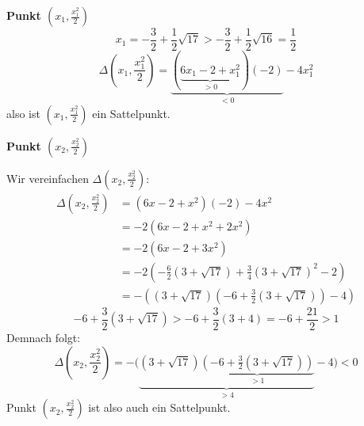 \documentclass[a4paper,12pt]{article}
\begin{document}
\begin{enumerate}[label=\alph*)]
    \textbf{Punkt $\left(x_1, \frac{x_1^2}{2}\right)$}
    \[
        x_1 = -\frac{3}{2} + \frac{1}{2}\sqrt{17} > -\frac{3}{2} + \frac{1}{2}\sqrt{16} = \frac{1}{2}
    \]
    \[
        \Delta\left(x_1, \frac{x_1^2}{2}\right) = \underbrace{(\underbrace{6x_1 - 2 + x_1^2}_{>0})(-2)}_{<0} - 4x_1^2
    \]
    also ist $\left(x_1, \frac{x_1^2}{2}\right)$ ein Sattelpunkt.

    \textbf{Punkt $\left(x_2, \frac{x_2^2}{2}\right)$}

    Wir vereinfachen $\Delta\left(x_2, \frac{x_2^2}{2}\right)$:
    \begin{align*}
        \Delta\left(x_2, \frac{x_2^2}{2}\right) &= (6x - 2 + x^2)(-2) - 4x^2 \\
        &= -2(6x - 2 + x^2 + 2x^2) \\
        &= -2(6x - 2 + 3x^2) \\
        &= -2\left(-\frac{6}{2}(3+\sqrt{17}) + \frac{3}{4}(3+\sqrt{17})^2 - 2\right) \\
        &= -\left((3+\sqrt{17})\left(-6 + \frac{3}{2}(3+\sqrt{17})\right) - 4\right)
    \end{align*}
    \[
        -6 + \frac{3}{2}(3+\sqrt{17}) > -6 + \frac{3}{2}(3+4) = -6 + \frac{21}{2} > 1
    \]
    Demnach folgt:
    \[
        \Delta\left(x_2, \frac{x_2^2}{2}\right) = -\Big(\underbrace{(3+\sqrt{17}) \underbrace{\left(-6 + \tfrac{3}{2}(3+\sqrt{17})\right)}_{>1}}_{>4} - 4\Big) < 0
    \]
    Punkt $\left(x_2, \frac{x_2^2}{2}\right)$ ist also auch ein Sattelpunkt.

\end{enumerate}
\end{document}
